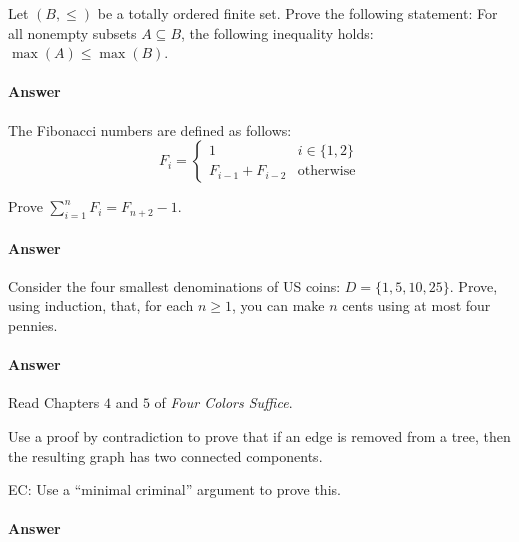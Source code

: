 \documentclass{article}
\begin{document}
Let $(B,\leq)$ be a totally ordered finite set. Prove the following
statement: For all nonempty subsets $A \subseteq B$, the following inequality
holds: $\max(A) \leq \max(B)$.

\paragraph{Answer}


\collab{\todo{}} 

The Fibonacci numbers are defined as follows:
$$
    F_i = \begin{cases}
            1 & i \in \{1,2\} \\
            F_{i-1}+F_{i-2} & \text{otherwise}
          \end{cases}
$$

Prove $\sum_{i=1}^n F_i = F_{n+2}-1$.

\paragraph{Answer}


\collab{\todo{}} 

Consider the four smallest denominations of US coins: $D=\{1,5,10,25\}$.  Prove, using
induction, that, for each $n \geq 1$, you can make $n$ cents using at most four
pennies.

\paragraph{Answer}


\collab{\todo{}} 

Read Chapters $4$ and $5$ of \emph{Four Colors Suffice}.

Use a proof by contradiction to prove that if an edge is removed from a
tree, then the resulting graph has two connected components.

EC:
Use a ``minimal criminal'' argument to prove this.

        \paragraph{Answer}


% 
% 
\end{document}
